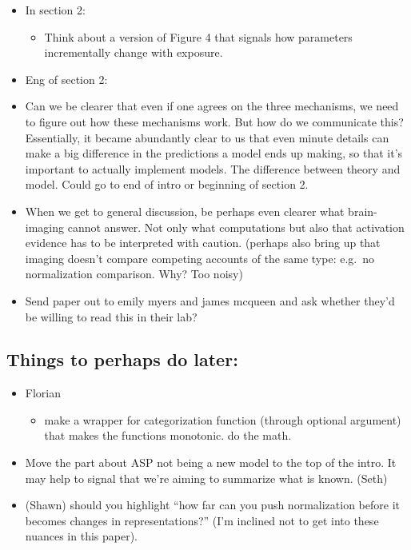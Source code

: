 \documentclass[
  11pt,
  english,
  man,floatsintext]{apa6}
\providecommand{\tightlist}{%
  \setlength{\itemsep}{0pt}\setlength{\parskip}{0pt}}
\begin{document}
\begin{itemize}
\item
  In section 2:

  \begin{itemize}
  \tightlist
  \item
    Think about a version of Figure 4 that signals how parameters incrementally change with exposure.
  \end{itemize}
\item
  Eng of section 2:
\item
  Can we be clearer that even if one agrees on the three mechanisms, we need to figure out how these mechanisms work. But how do we communicate this? Essentially, it became abundantly clear to us that even minute details can make a big difference in the predictions a model ends up making, so that it's important to actually implement models. The difference between theory and model. Could go to end of intro or beginning of section 2.
\item
  When we get to general discussion, be perhaps even clearer what brain-imaging cannot answer. Not only what computations but also that activation evidence has to be interpreted with caution. (perhaps also bring up that imaging doesn't compare competing accounts of the same type: e.g.~no normalization comparison. Why? Too noisy)
\item
  Send paper out to emily myers and james mcqueen and ask whether they'd be willing to read this in their lab?
\end{itemize}

\hypertarget{things-to-perhaps-do-later}{%
\subsection{Things to perhaps do later:}\label{things-to-perhaps-do-later}}

\begin{itemize}
\tightlist
\item
  Florian

  \begin{itemize}
  \tightlist
  \item
    make a wrapper for categorization function (through optional argument) that makes the functions monotonic. do the math.
  \end{itemize}
\item
  Move the part about ASP not being a new model to the top of the intro. It may help to signal that we're aiming to summarize what is known. (Seth)
\item
  (Shawn) should you highlight ``how far can you push normalization before it becomes changes in representations?'' (I'm inclined not to get into these nuances in this paper).
\end{itemize}
\end{document}
